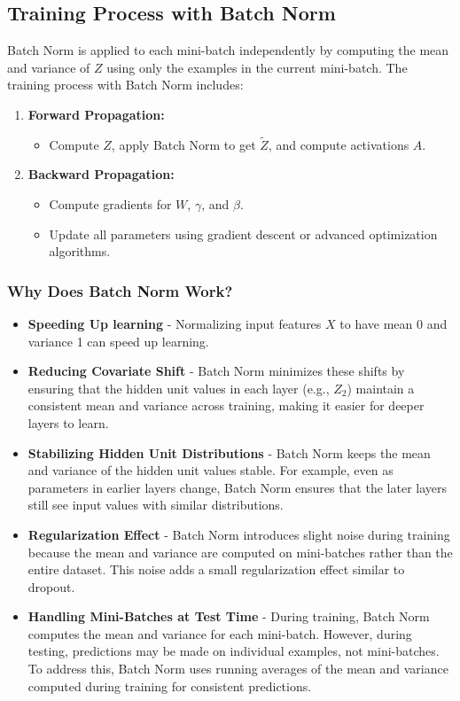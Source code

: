 \documentclass[letterpaper,12pt,notitlepage,twoside]{report}
\begin{document}
\subsection*{Training Process with Batch Norm}
Batch Norm is applied to each mini-batch independently by computing the mean and variance of \( Z \) using only the examples in the current mini-batch. The training process with Batch Norm includes:
\begin{enumerate}[noitemsep, topsep=0pt]
    \item \textbf{Forward Propagation:}
    \begin{itemize}
        \item Compute \( Z \), apply Batch Norm to get \( \tilde{Z} \), and compute activations \( A \).
    \end{itemize}
    \item \textbf{Backward Propagation:}
    \begin{itemize}
        \item Compute gradients for \( W \), \( \gamma \), and \( \beta \).
        \item Update all parameters using gradient descent or advanced optimization algorithms.
    \end{itemize}
\end{enumerate}

\subsubsection{Why Does Batch Norm Work?}
\begin{itemize}[noitemsep, topsep=0pt]
    \item \textbf{Speeding Up learning} - Normalizing input features \( X \) to have mean 0 and variance 1 can speed up learning.
    \item \textbf{Reducing Covariate Shift} - Batch Norm minimizes these shifts by ensuring that the hidden unit values in each layer (e.g., \(Z_2\)) maintain a consistent mean and variance across training, making it easier for deeper layers to learn.
    \item \textbf{Stabilizing Hidden Unit Distributions} - Batch Norm keeps the mean and variance of the hidden unit values stable. For example, even as parameters in earlier layers change, Batch Norm ensures that the later layers still see input values with similar distributions.
    \item \textbf{Regularization Effect} - Batch Norm introduces slight noise during training because the mean and variance are computed on mini-batches rather than the entire dataset. This noise adds a small regularization effect similar to dropout.
    \item \textbf{Handling Mini-Batches at Test Time} - During training, Batch Norm computes the mean and variance for each mini-batch. However, during testing, predictions may be made on individual examples, not mini-batches. To address this, Batch Norm uses running averages of the mean and variance computed during training for consistent predictions.
\end{itemize}
\end{document}

